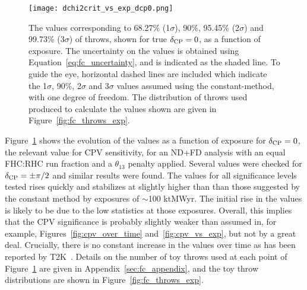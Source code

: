 \begin{figure}[htbp]
  \centering
  \texttt{[image: dchi2crit\_vs\_exp\_dcp0.png]}
  \caption{The \dchisqcrit values corresponding to 68.27\% (1$\sigma$), 90\%, 95.45\% (2$\sigma$) and 99.73\% (3$\sigma$) of throws, shown for true $\delta_{\rm CP} = 0$, as a function of exposure. The uncertainty on the \dchisqcrit values is obtained using Equation~\ref{eq:fc_uncertainty}, and is indicated as the shaded line. To guide the eye, horizontal dashed lines are included which indicate the 1$\sigma$, 90\%, 2$\sigma$ and 3$\sigma$ \dchisq values assumed using the constant-\dchisq method, with one degree of freedom. The distribution of throws used produced to calculate the \dchisqcrit values shown are given in Figure~\ref{fig:fc_throws_exp}.}
  \label{fig:fc_vs_exp}
\end{figure}
Figure~\ref{fig:fc_vs_exp} shows the evolution of the \dchisqcrit values as a function of exposure for $\delta_{\rm CP} = 0$, the relevant value for CPV sensitivity, for an ND+FD analysis with an equal FHC:RHC run fraction and a $\theta_{13}$ penalty applied. Several values were checked for $\delta_{\rm CP} = \pm\pi/2$ and similar results were found. The \dchisqcrit values for all significance levels tested rises quickly and stabilizes at slightly higher than than those suggested by the constant \dchisq method by exposures of $\sim$100 ktMWyr. The initial rise in the \dchisqcrit values is likely to be due to the low statistics at those exposures. Overall, this implies that the CPV significance is probably slightly weaker than assumed in, for example, Figures~\ref{fig:cpv_over_time} and~\ref{fig:cpv_vs_exp}, but not by a great deal. Crucially, there is no constant increase in the \dchisqcrit values over time as has been reported by T2K~\cite{Abe:2021gky}. Details on the number of toy throws used at each point of Figure~\ref{fig:fc_vs_exp} are given in Appendix~\ref{sec:fc_appendix}, and the toy throw distributions are shown in Figure~\ref{fig:fc_throws_exp}.

